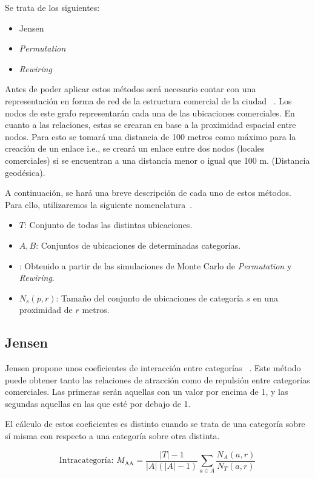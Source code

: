 Se trata de los siguientes:
\begin{itemize}
	\item Jensen
	\item \textit{Permutation}
	\item \textit{Rewiring}
\end{itemize}


Antes de poder aplicar estos métodos será necesario contar con una representación en forma de red de la estructura comercial de la ciudad ~\cite{Ahedo2021,RSVAJSSHJG}. Los nodos de este grafo representarán cada una de las ubicaciones comerciales. En cuanto a las relaciones, estas se crearan en base a la proximidad espacial entre nodos. Para esto se tomará una distancia de 100 metros como máximo para la creación de un enlace i.e., se creará un enlace entre dos nodos (locales comerciales) si se encuentran a una distancia menor o igual que 100 m. (Distancia geodésica).

A continuación, se hará una breve descripción de cada uno de estos métodos. Para ello, utilizaremos la siguiente nomenclatura~\cite{Ahedo2021,RSVAJSSHJG}.
\begin{itemize}
	\item $T$: Conjunto de todas las distintas ubicaciones.
	\item $A,B$: Conjuntos de ubicaciones de determinadas categorías.
	\item {}: Obtenido a partir de las simulaciones de Monte Carlo de \textit{Permutation} y \textit{Rewiring}.
	\item $N_s(p,r)$: Tamaño del conjunto de ubicaciones de categoría $s$ en una proximidad de $r$ metros.
\end{itemize}

\subsection{Jensen}


Jensen propone unos coeficientes de interacción entre categorías ~\cite{Jensen2006}. Este método puede obtener tanto las relaciones de atracción como de repulsión entre categorías comerciales. Las primeras serán aquellas con un valor por encima de 1, y las segundas aquellas en las que esté por debajo de 1.

El cálculo de estos coeficientes es distinto cuando se trata de una categoría sobre sí misma con respecto a una categoría sobre otra distinta.

\begin{equation*}
	\text{Intracategoría: } M_\text{AA} = \frac{|T| - 1}{|A|(|A|-1)} \sum_{a \in A}\frac{N_A(a,r)}{N_T(a,r)}
\end{equation*}

